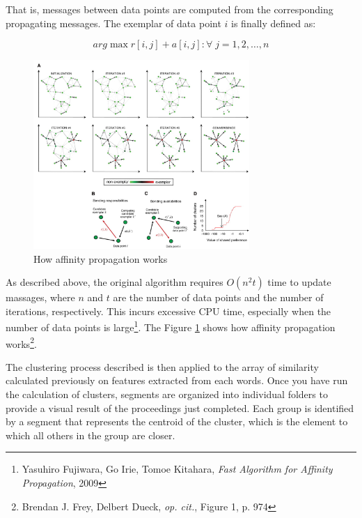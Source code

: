 That is, messages between data points are computed from the corresponding propagating messages. The exemplar of data point $i$ is finally defined as:

$$arg \max {r[i, j] + a[i, j] : \forall \; j = 1, 2, \ldots,n}$$

\begin{figure}[!htbp]
\centering
\includegraphics[width=0.73\textwidth]{images/ap.jpg}
\caption{How affinity propagation works}
\label{fig:ap}
\end{figure}

As described above, the original algorithm requires $O(n^2 t)$ time to update massages, where $n$ and $t$ are the number of data points and the number of iterations, respectively.
This incurs excessive CPU time, especially when the number of data points is large\footnote{Yasuhiro Fujiwara, Go Irie, Tomoe Kitahara, \emph{Fast Algorithm for Affinity Propagation}, 2009}. The Figure \ref{fig:ap} shows how affinity propagation works\footnote{Brendan J. Frey, Delbert Dueck, \emph{op. cit.}, Figure 1, p. 974}.

The clustering process described is then applied to the array of similarity calculated previously on features extracted from each words. Once you have run the calculation of clusters, segments are organized into individual folders to provide a visual result of the proceedings just completed. Each group is identified by a segment that represents the centroid of the cluster, which is the element to which all others in the group are closer.